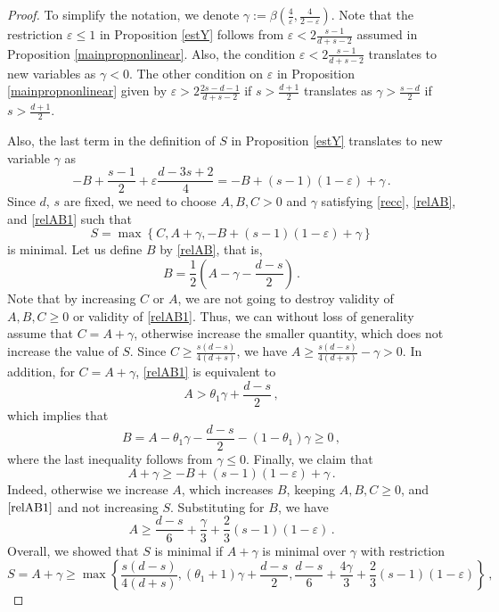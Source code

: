 \documentclass[10pt,leqno]{amsart}
\numberwithin{equation}{section}
\begin{document}
\begin{proof}
To simplify the notation, we denote $\gamma := \beta \left(\frac{4}{\varepsilon} , \frac{4}{2-\varepsilon}\right)$.
Note that the restriction $\varepsilon \leq 1$ in Proposition \ref{estY} follows from $\varepsilon < 2\frac{s - 1}{d + s - 2}$ assumed in  Proposition \ref{mainpropnonlinear}. 
Also, the condition $\varepsilon < 2\frac{s - 1}{d + s - 2}$ translates to new variables as $\gamma < 0$. 
The other condition on $\varepsilon$ in Proposition \ref{mainpropnonlinear} given by $\varepsilon > 2\frac{2s - d -1}{d+ s - 2}$ if $s > \frac{d + 1}{2}$ translates 
as $\gamma > \frac{s - d}{2}$ if $s > \frac{d + 1}{2}$.

Also, the last term in the definition of $S$ in Proposition \ref{estY} translates to new variable $\gamma$ as 
$$
-B+\frac{s-1}{2} + \varepsilon  \frac{d -3s+2}{4} = -B + (s - 1)(1 - \varepsilon) + \gamma \,.
$$
Since $d$, $s$ are fixed, we need to choose $A, B, C > 0$ and $\gamma$ satisfying \eqref{recc},  \eqref{relAB}, and \eqref{relAB1} such that 
$$S=\max \left\{C, A + \gamma, -B+ (s - 1)(1 - \varepsilon) + \gamma \right\}$$
is minimal. Let us define $B$ by \eqref{relAB}, that is, 
$$
B = \frac{1}{2}\left(A - \gamma - \frac{d-s}{2} \right)\,.
$$
Note that by increasing $C$ or $A$, we are not going to destroy validity of $A, B, C \geq 0$ or validity of \eqref{relAB1}. Thus, we can without loss of generality assume that $C = A + \gamma$, otherwise 
increase the smaller quantity, which does not increase the value of $S$. Since $C \geq \frac{s(d - s)}{4(d + s)}$, we have $A \geq \frac{s(d - s)}{4(d + s)}- \gamma > 0$.  
In addition, for $C = A + \gamma$, \eqref{relAB1} is equivalent to 
$$
A  > \theta_1 \gamma + \frac{d - s}{2} \,,
$$
which implies that
$$
B= A - \theta_1\gamma - \frac{d - s}{2} - (1 - \theta_1)\gamma \geq 0 \,,
$$
where the last inequality follows from $\gamma \leq 0$. Finally, we claim that 
$$
A + \gamma \geq -B+ (s - 1)(1 - \varepsilon) + \gamma \,.
$$
Indeed, otherwise we increase $A$, which increases $B$, keeping $A, B, C \geq 0$, and $\eqref{relAB1}$ and not increasing $S$. Substituting for $B$, we have 
$$
A  \geq  \frac{d - s}{6} + \frac{\gamma}{3} + \frac{2}{3}(s - 1)(1 - \varepsilon) \,.
$$
Overall, we showed that $S$ is minimal if $A + \gamma$ is minimal over $\gamma$ with restriction 
\begin{equation}\label{opm}
S = A + \gamma \geq \max \left\{\frac{s(d - s)}{4(d + s)},  (\theta_1 + 1) \gamma + \frac{d - s}{2},  \frac{d - s}{6} + \frac{4\gamma}{3} + \frac{2}{3}(s - 1)(1 - \varepsilon)  \right\} \,,

\end{equation}
\end{proof}
\end{document}
